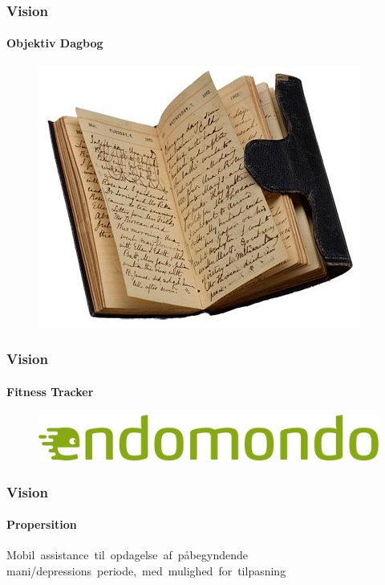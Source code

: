 \begin{frame}
\frametitle{Vision}
\framesubtitle{Objektiv Dagbog}
\begin{figure}
	\includegraphics[scale=0.5]{graphics/diary}
\end{figure}
\end{frame}

\begin{frame}
\frametitle{Vision}
\framesubtitle{Fitness Tracker}
\begin{figure}
	\includegraphics[scale=0.3]{graphics/fitnesstracker}
\end{figure}
\end{frame}

\begin{frame}
\frametitle{Vision}
\framesubtitle{Propersition}
\begin{center}
Mobil assistance til opdagelse af påbegyndende mani/depressions periode, med mulighed for tilpasning
\end{center}
\end{frame}